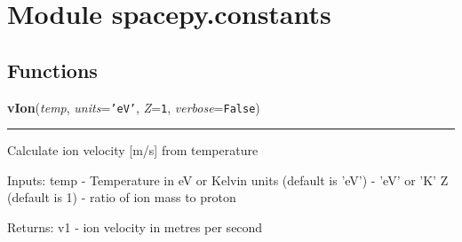 %
%
%


\section{Module spacepy.constants}

    \label{spacepy:constants}


  \subsection{Functions}

    \label{spacepy:constants:vIon}

    \vspace{0.5ex}

\hspace{.8\funcindent}\begin{boxedminipage}{\funcwidth}

    \raggedright \textbf{vIon}(\textit{temp}, \textit{units}={\tt \texttt{'}\texttt{eV}\texttt{'}}, \textit{Z}={\tt 1}, \textit{verbose}={\tt False})

    \vspace{-1.5ex}

    \rule{\textwidth}{0.5\fboxrule}
\setlength{\parskip}{2ex}
    Calculate ion velocity [m/s] from temperature

    Inputs: temp - Temperature in eV or Kelvin units (default is 'eV') - 
    'eV' or 'K' Z (default is 1) - ratio of ion mass to proton

    Returns: v1 - ion velocity in metres per second

\setlength{\parskip}{1ex}
    \end{boxedminipage}

